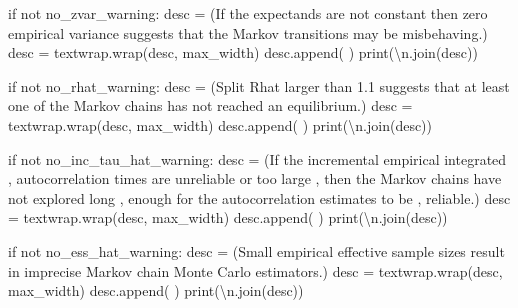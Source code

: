 \documentclass[
  letterpaper,
  DIV=11,
  numbers=noendperiod]{scrartcl}
\newenvironment{Shaded}{\begin{snugshade}}{\end{snugshade}}
\newcommand{\BuiltInTok}[1]{\textcolor[rgb]{0.00,0.23,0.31}{#1}}
\newcommand{\CharTok}[1]{\textcolor[rgb]{0.13,0.47,0.30}{#1}}
\newcommand{\ControlFlowTok}[1]{\textcolor[rgb]{0.00,0.23,0.31}{#1}}
\newcommand{\KeywordTok}[1]{\textcolor[rgb]{0.00,0.23,0.31}{#1}}
\newcommand{\NormalTok}[1]{\textcolor[rgb]{0.00,0.23,0.31}{#1}}
\newcommand{\OperatorTok}[1]{\textcolor[rgb]{0.37,0.37,0.37}{#1}}
\newcommand{\StringTok}[1]{\textcolor[rgb]{0.13,0.47,0.30}{#1}}
\begin{document}
\begin{Shaded}
\begin{Highlighting}[]
  \ControlFlowTok{if} \KeywordTok{not}\NormalTok{ no\_zvar\_warning:}
\NormalTok{    desc }\OperatorTok{=}\NormalTok{ (}\StringTok{\textquotesingle{}If the expectands are not constant then zero empirical \textquotesingle{}}
            \StringTok{\textquotesingle{}variance suggests that the Markov transitions may be \textquotesingle{}}
            \StringTok{\textquotesingle{}misbehaving.\textquotesingle{}}\NormalTok{)}
\NormalTok{    desc }\OperatorTok{=}\NormalTok{ textwrap.wrap(desc, max\_width)}
\NormalTok{    desc.append(}\StringTok{\textquotesingle{} \textquotesingle{}}\NormalTok{)}
    \BuiltInTok{print}\NormalTok{(}\StringTok{\textquotesingle{}}\CharTok{\textbackslash{}n}\StringTok{\textquotesingle{}}\NormalTok{.join(desc))}
  
  \ControlFlowTok{if} \KeywordTok{not}\NormalTok{ no\_rhat\_warning:}
\NormalTok{    desc }\OperatorTok{=}\NormalTok{ (}\StringTok{\textquotesingle{}Split Rhat larger than 1.1 suggests that at least one of \textquotesingle{}}
            \StringTok{\textquotesingle{}the Markov chains has not reached an equilibrium.\textquotesingle{}}\NormalTok{)}
\NormalTok{    desc }\OperatorTok{=}\NormalTok{ textwrap.wrap(desc, max\_width)}
\NormalTok{    desc.append(}\StringTok{\textquotesingle{} \textquotesingle{}}\NormalTok{)}
    \BuiltInTok{print}\NormalTok{(}\StringTok{\textquotesingle{}}\CharTok{\textbackslash{}n}\StringTok{\textquotesingle{}}\NormalTok{.join(desc))}

  \ControlFlowTok{if} \KeywordTok{not}\NormalTok{ no\_inc\_tau\_hat\_warning:}
\NormalTok{    desc }\OperatorTok{=}\NormalTok{ (}\StringTok{\textquotesingle{}If the incremental empirical integrated \textquotesingle{}}\NormalTok{,}
            \StringTok{\textquotesingle{}autocorrelation times are unreliable or too large \textquotesingle{}}\NormalTok{,}
            \StringTok{\textquotesingle{}then the Markov chains have not explored long \textquotesingle{}}\NormalTok{,}
            \StringTok{\textquotesingle{}enough for the autocorrelation estimates to be \textquotesingle{}}\NormalTok{,}
            \StringTok{\textquotesingle{}reliable.\textquotesingle{}}\NormalTok{)}
\NormalTok{    desc }\OperatorTok{=}\NormalTok{ textwrap.wrap(desc, max\_width)}
\NormalTok{    desc.append(}\StringTok{\textquotesingle{} \textquotesingle{}}\NormalTok{)}
    \BuiltInTok{print}\NormalTok{(}\StringTok{\textquotesingle{}}\CharTok{\textbackslash{}n}\StringTok{\textquotesingle{}}\NormalTok{.join(desc))}
  
  \ControlFlowTok{if} \KeywordTok{not}\NormalTok{ no\_ess\_hat\_warning:}
\NormalTok{    desc }\OperatorTok{=}\NormalTok{ (}\StringTok{\textquotesingle{}Small empirical effective sample sizes result in \textquotesingle{}}
            \StringTok{\textquotesingle{}imprecise Markov chain Monte Carlo estimators.\textquotesingle{}}\NormalTok{)}
\NormalTok{    desc }\OperatorTok{=}\NormalTok{ textwrap.wrap(desc, max\_width)}
\NormalTok{    desc.append(}\StringTok{\textquotesingle{} \textquotesingle{}}\NormalTok{)}
    \BuiltInTok{print}\NormalTok{(}\StringTok{\textquotesingle{}}\CharTok{\textbackslash{}n}\StringTok{\textquotesingle{}}\NormalTok{.join(desc))}
    

\end{Highlighting}
\end{Shaded}
\end{document}
